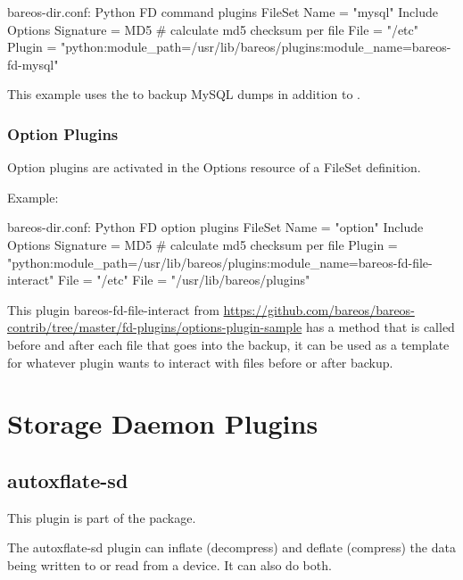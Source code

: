 \begin{bconfig}{bareos-dir.conf: Python FD command plugins}
FileSet {
  Name = "mysql"
  Include {
    Options {
      Signature = MD5 # calculate md5 checksum per file
    }
    File = "/etc"
    Plugin = "python:module_path=/usr/lib/bareos/plugins:module_name=bareos-fd-mysql"
  }
} 
\end{bconfig}

This example uses the  to backup MySQL dumps in addition to .

\subsubsection{Option Plugins}
Option plugins are activated in the Options resource of a FileSet definition.

Example:

\begin{bconfig}{bareos-dir.conf: Python FD option plugins}
FileSet {
  Name = "option"
  Include {
    Options {
      Signature = MD5 # calculate md5 checksum per file
      Plugin = "python:module_path=/usr/lib/bareos/plugins:module_name=bareos-fd-file-interact"
    }
    File = "/etc"
    File = "/usr/lib/bareos/plugins"
  }
}
\end{bconfig}

This plugin bareos-fd-file-interact from \url{https://github.com/bareos/bareos-contrib/tree/master/fd-plugins/options-plugin-sample} has a method that is called before and after each file that goes into the backup,
it can be used as a template for whatever plugin wants to interact with files before or after backup.



\section{Storage Daemon Plugins}
\label{sdPlugins}

\subsection{autoxflate-sd}
\label{plugin-autoxflate-sd}


This plugin is part of the  package.

The autoxflate-sd plugin can inflate (decompress) and deflate (compress)
the data being written to or read from a device. It can also do both.

